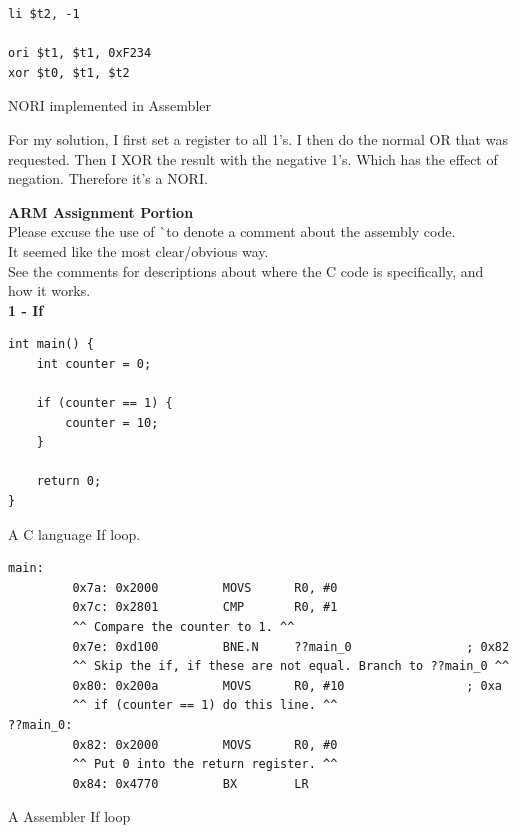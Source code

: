 \documentclass[12pt,a4paper]{report}
\begin{document}
\begin{normalsize}
\lstset{language=[x86masm]Assembler}
\begin{lstlisting}
li $t2, -1

ori $t1, $t1, 0xF234
xor $t0, $t1, $t2
\end{lstlisting}	
\begin{center}
\small{NORI implemented in Assembler}
\end{center}

For my solution, I first set a register to all 1's. I then do the normal OR that was requested. Then I XOR the result with the negative 1's. Which has the effect of negation.
Therefore it's a NORI. \\ 

\medskip

\textbf{ARM Assignment Portion} \\
Please excuse the use of ^^ to denote a comment about the assembly code. \\
It seemed like the most clear/obvious way. \\
See the comments for descriptions about where the C code is specifically, and how it works. \\

\textbf{1 - If} \\

\lstset{language=C}
\begin{lstlisting}
int main() {
    int counter = 0;

	if (counter == 1) {
		counter = 10;
	}

    return 0;
}
\end{lstlisting}	
\begin{center}
\small{A C language If loop.}
\end{center}

\lstset{language=[x86masm]Assembler}
\begin{lstlisting}
main:
         0x7a: 0x2000         MOVS      R0, #0
         0x7c: 0x2801         CMP       R0, #1 
         ^^ Compare the counter to 1. ^^
         0x7e: 0xd100         BNE.N     ??main_0                ; 0x82 
         ^^ Skip the if, if these are not equal. Branch to ??main_0 ^^
         0x80: 0x200a         MOVS      R0, #10                 ; 0xa
         ^^ if (counter == 1) do this line. ^^
??main_0:
         0x82: 0x2000         MOVS      R0, #0 
         ^^ Put 0 into the return register. ^^
         0x84: 0x4770         BX        LR
\end{lstlisting}	
\begin{center}
\small{A Assembler If loop}
\end{center} 



\end{normalsize}
\end{document}
